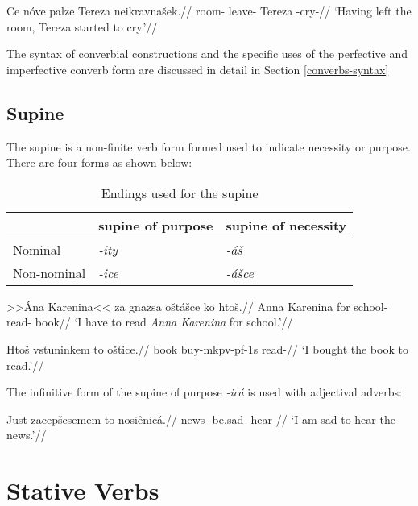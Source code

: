 \pex
\begingl
\gla Ce nóve palze Tereza neikravna\v{s}ek.//
\glb {} room- leave- Tereza -cry-//
\glft `Having left the room, Tereza started to cry.'//
\endgl
\xe

The syntax of converbial constructions and the specific uses of the perfective and imperfective converb form are discussed in detail in Section \ref{converbs-syntax}


\subsection{Supine}
The supine is a non-finite verb form formed used to indicate necessity or purpose. There are four forms as shown below:

\begin{table}[h!]
	\centering\small
	\caption{Endings used for the supine}
	\begin{tabularx}{0.8\textwidth}{MMM}
		\toprule
		&{\sc supine of purpose}&{\sc supine of necessity}\\
		\midrule
		Nominal & \textit{-ity} & \textit{-á\v{s}}\\
		\addlinespace
		Non-nominal & \textit{-ice} & \textit{-á\v{s}ce}\\
		\bottomrule
	\end{tabularx}
\end{table}


	\pex
\begingl
\gla >>Ána Karenina<< za gnazsa o\v{s}tá\v{s}ce ko hto\v{s}.//
\glb Anna Karenina for school- read-  book//
\glft `I have to read \textit{Anna Karenina} for school.'//
\endgl
\xe

	\pex
\begingl
\gla Hto\v{s} vstuninkem to o\v{s}tice.//
\glb book buy-mk{pv-pf-1s}  read-//
\glft `I bought the book to read.'//
\endgl
\xe

\par The infinitive form of the supine of purpose \textit{-icá} is used with adjectival adverbs:

\pex
\begingl
\gla Just zacep\v{s}csemem to nosiênicá.//
\glb news -be.sad-  hear-//
\glft `I am sad to hear the news.'//
\endgl
\xe


\section{Stative Verbs}


